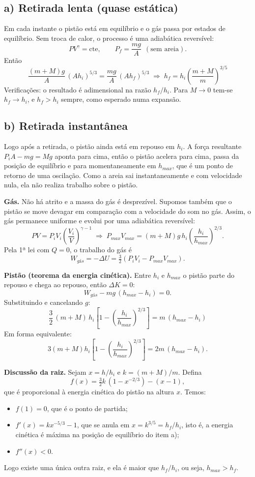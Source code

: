 \documentclass{article}%
\begin{document}
\subsection*{a) Retirada lenta (quase estática)}
Em cada instante o pistão está em equilíbrio e o gás passa por estados de equilíbrio. Sem troca de calor, o processo é uma adiabática reversível:
\[
PV^{\gamma}=\text{cte},\qquad P_f=\frac{mg}{A}\ \ (\text{sem areia}).
\]
Então
\[
\frac{(m+M)g}{A}\,(Ah_i)^{5/3}=\frac{mg}{A}\,(Ah_f)^{5/3}
\;\Rightarrow\;
\boxed{h_f=h_i\left(\frac{m+M}{m}\right)^{3/5}}
\]
Verificações: o resultado é adimensional na razão $h_f/h_i$. Para $M\to 0$ tem-se $h_f\to h_i$, e $h_f>h_i$ sempre, como esperado numa expansão.

\subsection*{b) Retirada instantânea}
Logo após a retirada, o pistão ainda está em repouso em $h_i$. A força resultante $P_iA-mg=Mg$ aponta para cima, então o pistão acelera para cima, passa da posição de equilíbrio e para momentaneamente em $h_{max}$, que é um ponto de retorno de uma oscilação. Como a areia sai instantaneamente e com velocidade nula, ela não realiza trabalho sobre o pistão.

\textbf{Gás.} Não há atrito e a massa do gás é desprezível. Supomos também que o pistão se move devagar em comparação com a velocidade do som no gás. Assim, o gás permanece uniforme e evolui por uma adiabática reversível:
\[
PV=P_iV_i\left(\frac{V_i}{V}\right)^{\gamma-1}
\;\Rightarrow\;
P_{max}V_{max}=(m+M)g\,h_i\left(\frac{h_i}{h_{max}}\right)^{2/3}.
\]
Pela 1ª lei com $Q=0$, o trabalho do gás é
\[
W_{gás}=-\Delta U=\tfrac32\left(P_iV_i-P_{max}V_{max}\right).
\]

\textbf{Pistão (teorema da energia cinética).} Entre $h_i$ e $h_{max}$ o pistão parte do repouso e chega ao repouso, então $\Delta K=0$:
\[
W_{gás}-mg\,(h_{max}-h_i)=0 .
\]
Substituindo e cancelando $g$:
\[
\boxed{\;\frac32\,(m+M)\,h_i\left[1-\left(\frac{h_i}{h_{max}}\right)^{2/3}\right]=m\,(h_{max}-h_i)\;}
\]
Em forma equivalente:
\[
3(m+M)h_i\left[1-\left(\frac{h_i}{h_{max}}\right)^{2/3}\right]=2m\,(h_{max}-h_i).
\]

\textbf{Discussão da raiz.} Sejam $x=h/h_i$ e $k=(m+M)/m$. Defina
\[
f(x)=\tfrac32k\,(1-x^{-2/3})-(x-1),
\]
que é proporcional à energia cinética do pistão na altura $x$. Temos:
\begin{itemize}
\item $f(1)=0$, que é o ponto de partida;
\item $f'(x)=kx^{-5/3}-1$, que se anula em $x=k^{3/5}=h_f/h_i$, isto é, a energia cinética é máxima na posição de equilíbrio do item a);
\item $f''(x)<0$.
\end{itemize}
Logo existe uma única outra raiz, e ela é maior que $h_f/h_i$, ou seja, $h_{max}>h_f$.
\end{document}
